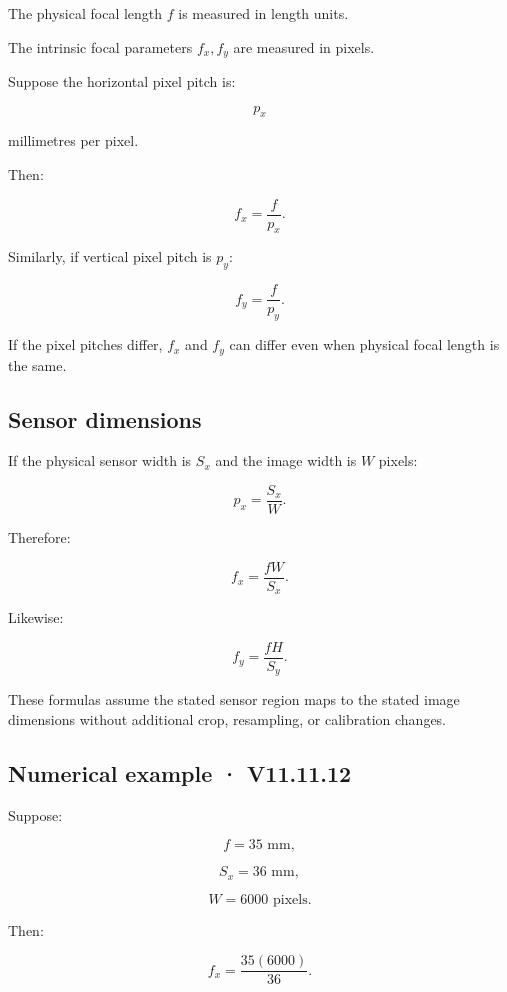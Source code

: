 The physical focal length \(f\) is measured in length units.

The intrinsic focal parameters \(f_x,f_y\) are measured in pixels.

Suppose the horizontal pixel pitch is:

\[
 p_x
\]

millimetres per pixel.

Then:

\[
 \boxed{ f_x=\frac f{p_x} }.
\]

Similarly, if vertical pixel pitch is \(p_y\):

\[
 \boxed{ f_y=\frac f{p_y} }.
\]

If the pixel pitches differ, \(f_x\) and \(f_y\) can differ even when physical focal length is the same.

\subsection{Sensor dimensions}\label{02-foundations-ii-ch034-sensor-dimensions}

\hypertarget{02-foundations-ii-ch034-sensor-dimensions}{}

If the physical sensor width is \(S_x\) and the image width is \(W\) pixels:

\[
 p_x=\frac{S_x}{W}.
\]

Therefore:

\[
 \boxed{ f_x=\frac{fW}{S_x} }.
\]

Likewise:

\[
 \boxed{ f_y=\frac{fH}{S_y} }.
\]

These formulas assume the stated sensor region maps to the stated image dimensions without additional crop, resampling, or calibration changes.

\subsection{Numerical example · V11.11.12}\label{02-foundations-ii-ch034-numerical-example-v11.11.12}

\hypertarget{02-foundations-ii-ch034-numerical-example-v11.11.12}{}

Suppose:

\[
 f=35\text{ mm},
\]

\[
 S_x=36\text{ mm},
\]

\[
 W=6000\text{ pixels}.
\]

Then:

\[
 f_x=\frac{35(6000)}{36}.
\]


